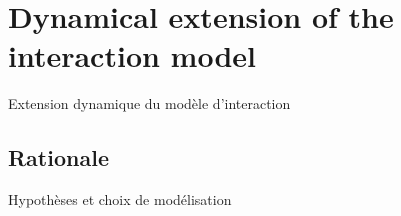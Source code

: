 




\newpage

\section[Interaction model][Modèle d'interaction]{Dynamical extension of the interaction model}{Extension dynamique du modèle d'interaction}







\subsection{Rationale}{Hypothèses et choix de modélisation}


